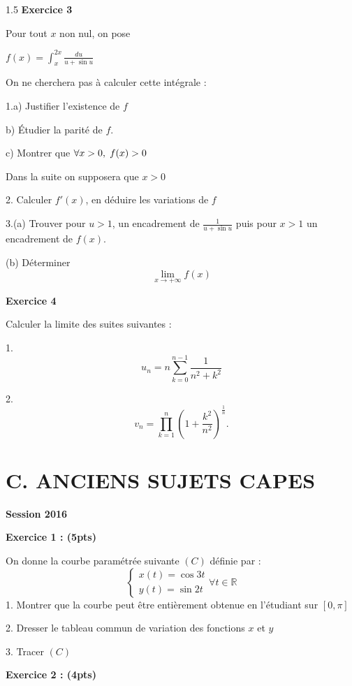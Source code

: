\documentclass[12pt]{article}
\begin{document}
\begin{spacing}{1.5}
 \medskip\textbf{Exercice 3 }
 
 Pour tout $x$ non nul, on pose
 
 $f(x)=\int_{x}^{2x}\frac{du}{u+\sin u}$
 
 On ne cherchera pas à calculer cette intégrale :
 
 1.a) Justifier l'existence de $f$
 
 b) Étudier la parité de $f$.
 
 c) Montrer que $\forall x>0, \hspace{0.1cm}f(x)>0$
 
 Dans la suite on supposera que $x>0$
 
 2. Calculer $f'(x)$, en déduire les variations de $f$
 
 3.(a) Trouver pour $u>1$, un encadrement de $\frac{1}{u+\sin u}$ puis pour $x>1$ un encadrement de $f(x)$.
 
(b) Déterminer \[
\lim_{x\to +\infty}f(x)
\]

\medskip
\textbf{Exercice 4}

Calculer la limite des suites suivantes :

1. \[
u_n=n\sum_{k=0}^{n-1}\frac{1}{n^2+k^2}
\]

2. \[
v_n=\prod_{k=1}^{n}\left(1+\frac{k^2}{n^2}\right)^{\frac{1}{n}}.
\]
 
 
 
 
 
 
 
 
 
 \newpage



\section*{\textbf{C. ANCIENS SUJETS CAPES}}


\textbf{Session 2016}

\textbf{Exercice 1 : (5pts)}

On donne la courbe paramétrée suivante $(C)$ définie par : 
\[
\begin{cases}
x(t)=\cos{3t}\\
y(t)=\sin{2t}
\end{cases}\forall {t\in \mathbb{R}}
\]
1. Montrer que la courbe peut être entièrement obtenue en l'étudiant sur $[0,\pi]$

2. Dresser le tableau commun de variation des fonctions $x$ et $y$

3. Tracer $(C)$

\textbf{Exercice 2 : (4pts)}


\end{spacing}
\end{document}
